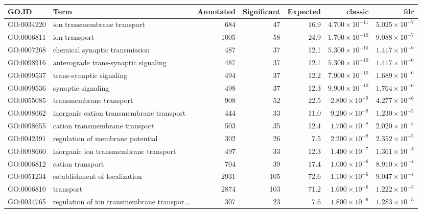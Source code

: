 \begin{table}[ht]
\centering
\begin{tabular}{llrrrrr}
  \hline
GO.ID & Term & Annotated & Significant & Expected & classic & fdr \\ 
  \hline
GO:0034220 & ion transmembrane transport & 684 & 47 & 16.9 & $4.700 \times 10^{-11}$ & $5.025 \times 10^{-7}$ \\ 
  GO:0006811 & ion transport & 1005 & 58 & 24.9 & $1.700 \times 10^{-10}$ & $9.088 \times 10^{-7}$ \\ 
  GO:0007268 & chemical synaptic transmission & 487 & 37 & 12.1 & $5.300 \times 10^{-10}$ & $1.417 \times 10^{-6}$ \\ 
  GO:0098916 & anterograde trans-synaptic signaling & 487 & 37 & 12.1 & $5.300 \times 10^{-10}$ & $1.417 \times 10^{-6}$ \\ 
  GO:0099537 & trans-synaptic signaling & 494 & 37 & 12.2 & $7.900 \times 10^{-10}$ & $1.689 \times 10^{-6}$ \\ 
  GO:0099536 & synaptic signaling & 498 & 37 & 12.3 & $9.900 \times 10^{-10}$ & $1.764 \times 10^{-6}$ \\ 
  GO:0055085 & transmembrane transport & 908 & 52 & 22.5 & $2.800 \times 10^{-9}$ & $4.277 \times 10^{-6}$ \\ 
  GO:0098662 & inorganic cation transmembrane transport & 444 & 33 & 11.0 & $9.200 \times 10^{-9}$ & $1.230 \times 10^{-5}$ \\ 
  GO:0098655 & cation transmembrane transport & 503 & 35 & 12.4 & $1.700 \times 10^{-8}$ & $2.020 \times 10^{-5}$ \\ 
  GO:0042391 & regulation of membrane potential & 302 & 26 & 7.5 & $2.200 \times 10^{-8}$ & $2.352 \times 10^{-5}$ \\ 
  GO:0098660 & inorganic ion transmembrane transport & 497 & 33 & 12.3 & $1.400 \times 10^{-7}$ & $1.361 \times 10^{-4}$ \\ 
  GO:0006812 & cation transport & 704 & 39 & 17.4 & $1.000 \times 10^{-6}$ & $8.910 \times 10^{-4}$ \\ 
  GO:0051234 & establishment of localization & 2931 & 105 & 72.6 & $1.100 \times 10^{-6}$ & $9.047 \times 10^{-4}$ \\ 
  GO:0006810 & transport & 2874 & 103 & 71.2 & $1.600 \times 10^{-6}$ & $1.222 \times 10^{-3}$ \\ 
  GO:0034765 & regulation of ion transmembrane transpor... & 307 & 23 & 7.6 & $1.800 \times 10^{-6}$ & $1.283 \times 10^{-3}$ \\ 

\end{tabular}
\end{table}
